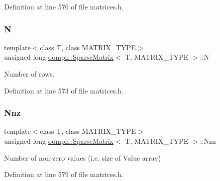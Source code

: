 Definition at line 576 of file matrices.\+h.

\mbox{\label{classoomph_1_1SparseMatrix_a8f15f962605f52fc75e8679efc6c8677}} 
\subsubsection{\texorpdfstring{N}{N}}
{\footnotesize\ttfamily template$<$class T, class M\+A\+T\+R\+I\+X\+\_\+\+T\+Y\+PE$>$ \\
unsigned long \hyperlink{classoomph_1_1SparseMatrix}{oomph\+::\+Sparse\+Matrix}$<$ T, M\+A\+T\+R\+I\+X\+\_\+\+T\+Y\+PE $>$\+::N\hspace{0.3cm}{\ttfamily [protected]}}



Number of rows. 



Definition at line 573 of file matrices.\+h.

\mbox{\label{classoomph_1_1SparseMatrix_a1459cbaeec275fe95ba45f7d843b26a5}} 
\subsubsection{\texorpdfstring{Nnz}{Nnz}}
{\footnotesize\ttfamily template$<$class T, class M\+A\+T\+R\+I\+X\+\_\+\+T\+Y\+PE$>$ \\
unsigned long \hyperlink{classoomph_1_1SparseMatrix}{oomph\+::\+Sparse\+Matrix}$<$ T, M\+A\+T\+R\+I\+X\+\_\+\+T\+Y\+PE $>$\+::Nnz\hspace{0.3cm}{\ttfamily [protected]}}



Number of non-\/zero values (i.\+e. size of Value array) 



Definition at line 579 of file matrices.\+h.

\mbox{\label{classoomph_1_1SparseMatrix_a55b53c70fe3906a65d0f84c429e963b1}} 
